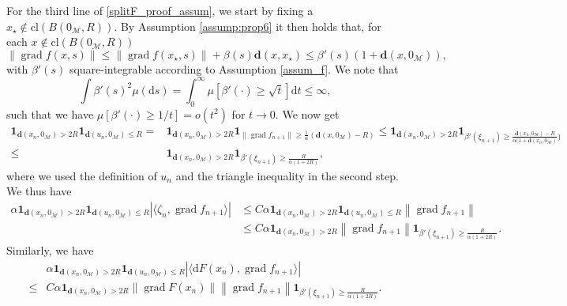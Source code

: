 \documentclass{article}
\newcommand{\CM}{\mathcal{M}}
\newcommand{\rd}{\mathrm{d}}
\newcommand{\bd}{\mathbf{d}}
\DeclareMathOperator{\grad}{grad}
\newcommand{\norm}[1]{\left\lVert#1\right\rVert}
\begin{document}
For the third line of \eqref{splitF_proof_assum}, we start by fixing a $x_\star\notin \text{cl}(B(0_\CM,R))$. By Assumption \ref{assump:prop6} it then holds that, for each $x\notin\text{cl}(B(0_\CM,R))$
\begin{equation}
    \norm{\grad f(x,s)}\leq \norm{\grad f(x_\star,s)}+\beta(s)\bd(x,x_\star)\leq \beta'(s)(1+\bd(x,0_\CM)),
\end{equation}
with $\beta'(s)$ square-integrable according to Assumption \ref{assum_f}. We note that
\begin{equation}
    \int\beta'(s)^2\mu(\rd s)=\int_0^\infty \mu[\beta'(\cdot)\geq \sqrt{t}]\rd t\leq \infty,
\end{equation}
such that we have $\mu[\beta'(\cdot)\geq 1/t]=o(t^2)$ for $t\to 0$. We now get
\begin{equation}
    \begin{aligned}
        \mathbf{1}_{\bd(x_n,0_\CM)>2R}\mathbf{1}_{\bd(u_n,0_\CM)\leq R}=&\mathbf{1}_{\bd(x_n,0_\CM)>2R}\mathbf{1}_{\norm{\grad f_{n+1}}\geq \tfrac{1}{\alpha}(\bd(x,0_\CM)-R)}\leq \mathbf{1}_{\bd(x_n,0_\CM)>2R}\mathbf{1}_{\beta'(\xi_{n+1})\geq \frac{\bd(x_n,0_\CM)-R}{\alpha(1+\bd(x_n,0_\CM)})}\\
        \leq&\mathbf{1}_{\bd(x_n,0_\CM)>2R}\mathbf{1}_{\beta'(\xi_{n+1})\geq\frac{R}{\alpha (1+2R)}},
    \end{aligned}
\end{equation}
where we used the definition of $u_n$ and the triangle inequality in the second step. We thus have
\begin{equation}\label{proof_assum_3a}
    \begin{aligned}
        \alpha\mathbf{1}_{\bd(x_n,0_\CM)>2R}\mathbf{1}_{\bd(u_n,0_\CM)\leq R}|\langle\zeta_n,\grad f_{n+1}\rangle|&\leq C\alpha\mathbf{1}_{\bd(x_n,0_\CM)>2R}\mathbf{1}_{\bd(u_n,0_\CM)\leq R}\norm{\grad f_{n+1}}\\
        &\leq C\alpha \mathbf{1}_{\bd(x_n,0_\CM)>2R}\norm{\grad f_{n+1}}\mathbf{1}_{\beta'(\xi_{n+1})\geq \frac{R}{\alpha(1+2R)}}.
    \end{aligned}
\end{equation}
Similarly, we have
\begin{equation}\label{proof_assum_3b}
\begin{aligned}
    &\alpha\mathbf{1}_{\bd(x_n,0_\CM)>2R}\mathbf{1}_{\bd(u_n,0_\CM)\leq R}|\langle\rd F(x_n),\grad f_{n+1}\rangle|\\\leq& C\alpha \mathbf{1}_{\bd(x_n,0_\CM)>2R}\norm{\grad F(x_n)}\norm{\grad f_{n+1}}\mathbf{1}_{\beta'(\xi_{n+1})\geq \frac{R}{\alpha(1+2R)}}.
\end{aligned}
\end{equation}
\end{document}
